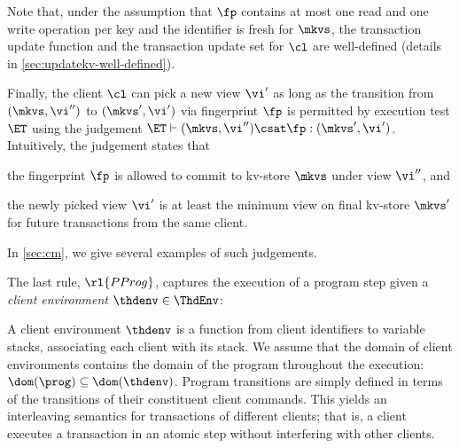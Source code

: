 Note that,  under the assumption that $\fp$ contains at most one read and one write 
operation per key and the identifier is fresh for $\mkvs$, 
the transaction update function and the transaction update set for
$\cl$ are well-defined (details in \cref{sec:updatekv-well-defined}). 

Finally, the client \( \cl \) can pick a new view \( \vi' \) as long as 
the transition from \( (\mkvs, \vi'') \) to \( (\mkvs', \vi') \)  via fingerprint \( \fp \) 
is permitted by execution test $\ET$ using the judgement $\ET \vdash (\mkvs, \vi'') \csat \fp : (\mkvs', \vi')$.
Intuitively, the judgement states that 
\begin{enumerate*}
    \item the fingerprint $\fp$ is allowed to commit to kv-store $\mkvs$ under view $\vi''$, 
    and \item the newly picked view $\vi'$ is at least the minimum view on final kv-store \( \mkvs' \) 
    for future transactions from the same client.
\end{enumerate*}
In \cref{sec:cm}, we give several examples of such judgements.

The last rule, \( \rl{PProg} \), captures the execution of a program step 
given a \emph{client environment} $\thdenv \in \ThdEnv$:
\begin{mathpar}
\end{mathpar}
A client environment $\thdenv$ is a function from client identifiers to variable stacks, associating each client with its stack. 
We assume that the domain of client environments contains 
the domain of the program throughout the execution: 
$\dom(\prog) \subseteq \dom(\thdenv)$.
Program transitions are simply defined in terms of the transitions of
their constituent client commands. 
This yields an interleaving semantics for transactions of different clients; 
that is, a client executes a transaction in an atomic step without
interfering with other clients. 
